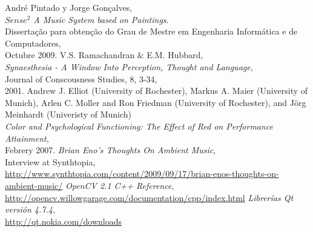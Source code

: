 \begin{thebibliography}{9}
  André Pintado y Jorge Gonçalves,\\
  \emph{$Sense^{2}$ A Music System based on Paintings}.\\
  Dissertação para obtenção do Grau de Mestre em Engenharia Informática e de Computadores,\\
  Octubre 2009.
  V.S. Ramachandran \& E.M. Hubbard,\\
  \emph{Synaesthesia - A Window Into Perception, Thought and Language},\\
  Journal of Conscousness Studies, 8, 3-34,\\
  2001.
  Andrew J. Elliot (University of Rochester), Markus A. Maier (University of Munich), Arlen C. Moller and Ron Friedman (University of Rochester), and Jörg Meinhardt (Univeristy of Munich)\\
  \emph{Color and Psychological Functioning: The Effect of Red on Performance Attainment},\\
  Febrery 2007.  
  \emph{Brian Eno's Thoughts On Ambient Music},\\
  Interview at Synthtopia,\\
  \url{http://www.synthtopia.com/content/2009/09/17/brian-enos-thoughts-on-ambient-music/}
  \emph{OpenCV 2.1 C++ Reference},\\
  \url{http://opencv.willowgarage.com/documentation/cpp/index.html}
  \emph{Librerías Qt versión 4.7.4},\\
  \url{http://qt.nokia.com/downloads}
  
\end{thebibliography}